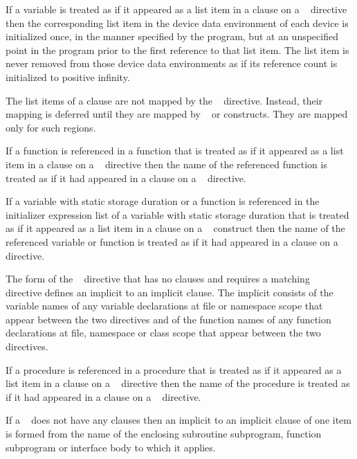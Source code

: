If a variable is treated as if it appeared as a list item in a 
clause on a ~ directive then the corresponding list
item in the device data environment of each device is initialized once, in the
manner specified by the program, but at an unspecified point in the program
prior to the first reference to that list item.  The list item is never removed
from those device data environments as if its reference count is initialized to
positive infinity.

The list items of a  clause are not mapped 
by the ~ directive. Instead, their mapping
is deferred until they are mapped by ~ 
or  constructs. They are mapped only for such regions.

\pagebreak
\begin{ccppspecific}
If a function is referenced in a function that is treated as if it appeared as
a list item in a  clause on a ~ directive
then the name of the referenced function is treated as if it had appeared in a
 clause on a ~ directive.

If a variable with static storage duration or a function is referenced in the
initializer expression list of a variable with static storage duration that is
treated as if it appeared as a list item in a  clause on a
~ construct then the name of the referenced variable
or function is treated as if it had appeared in a  clause on a
~ directive.

The form of the ~ directive that has no clauses 
and requires a matching ~~ directive
defines an implicit  to an implicit 
clause. The implicit  consists of the variable names 
of any variable declarations at file or namespace scope that appear between 
the two directives and of the function names of any function declarations at 
file, namespace or class scope that appear between the two directives.
\end{ccppspecific}

\begin{fortranspecific}
If a procedure is referenced in a procedure that is treated as if it appeared
as a list item in a  clause on a ~
directive then the name of the procedure is treated as if it had appeared in a
 clause on a ~ directive.

If a ~ does not have any clauses then an implicit 
 to an implicit  clause of one item is formed from
the name of the enclosing subroutine subprogram, function subprogram or 
interface body to which it applies.
\end{fortranspecific}

